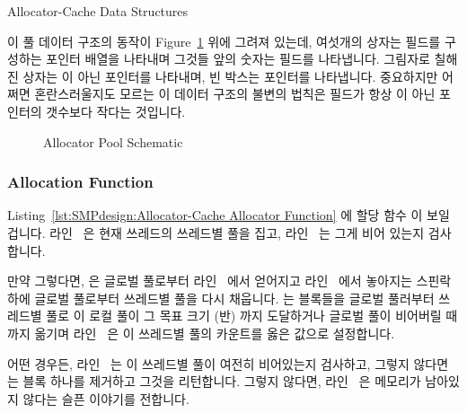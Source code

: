 \fi

\begin{listing}[tbp]

\caption{Allocator-Cache Data Structures}
\label{lst:SMPdesign:Allocator-Cache Data Structures}
\end{listing}

이 풀 데이터 구조의 동작이
Figure~\ref{fig:SMPdesign:Allocator Pool Schematic} 위에 그려져 있는데,
여섯개의 상자는  필드를 구성하는 포인터 배열을 나타내며 그것들 앞의
숫자는  필드를 나타냅니다.
그림자로 칠해진 상자는  이 아닌 포인터를 나타내며, 빈 박스는 
포인터를 나타냅니다.
중요하지만 어쩌면 혼란스러울지도 모르는 이 데이터 구조의 불변의 법칙은 
필드가 항상  이 아닌 포인터의 갯수보다 작다는 것입니다.

\begin{figure}[tbp]
\centering
{}
\caption{Allocator Pool Schematic}
\label{fig:SMPdesign:Allocator Pool Schematic}
\end{figure}

\subsubsection{Allocation Function}

\begin{fcvref}
Listing~\ref{lst:SMPdesign:Allocator-Cache Allocator Function} 에 할당 함수
 이 보일 겁니다.
라인~ 은 현재 쓰레드의 쓰레드별 풀을 집고, 라인~
는 그게 비어 있는지 검사합니다.

만약 그렇다면,  은 글로벌 풀로부터 라인~ 에서
얻어지고 라인~ 에서 놓아지는 스핀락 하에 글로벌 풀로부터 쓰레드별
풀을 다시 채웁니다.
 는 블록들을 글로벌 풀러부터 쓰레드별 풀로 이 로컬
풀이 그 목표 크기 (반) 까지 도달하거나 글로벌 풀이 비어버릴 때까지 옮기며
라인~ 은 이 쓰레드별 풀의 카운트를 옳은 값으로 설정합니다.

어떤 경우든, 라인~ 는 이 쓰레드별 풀이 여전히 비어있는지
검사하고, 그렇지 않다면  는 블록 하나를 제거하고
그것을 리턴합니다.
그렇지 않다면, 라인~ 은 메모리가 남아있지 않다는 슬픈 이야기를
전합니다.
\end{fcvref}

